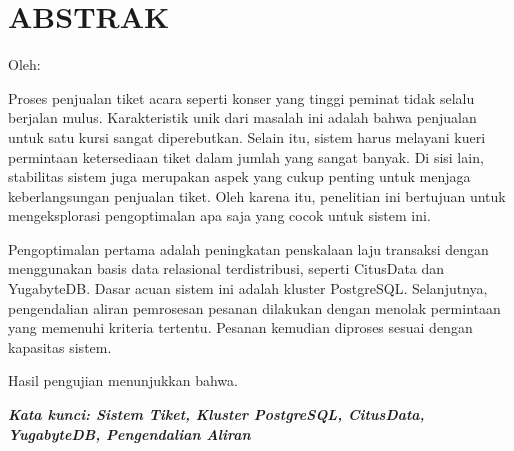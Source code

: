 \clearpage
\chapter*{ABSTRAK}
\begin{center}
  \center
  \begin{singlespace}
    \large\bfseries\MakeUppercase{\thetitle}

    \normalfont\normalsize
    Oleh:

    \bfseries \theauthor
  \end{singlespace}
\end{center}

\begin{singlespace}
  \small
  Proses penjualan tiket acara seperti konser yang tinggi peminat tidak selalu berjalan mulus. Karakteristik unik dari masalah ini adalah bahwa penjualan untuk satu kursi sangat diperebutkan. Selain itu, sistem harus melayani kueri permintaan ketersediaan tiket dalam jumlah yang sangat banyak. Di sisi lain, stabilitas sistem juga merupakan aspek yang cukup penting untuk menjaga keberlangsungan penjualan tiket. Oleh karena itu, penelitian ini bertujuan untuk mengeksplorasi pengoptimalan apa saja yang cocok untuk sistem ini.

  Pengoptimalan pertama adalah peningkatan penskalaan laju transaksi dengan menggunakan basis data relasional terdistribusi, seperti CitusData dan YugabyteDB. Dasar acuan sistem ini adalah kluster PostgreSQL. Selanjutnya, pengendalian aliran pemrosesan pesanan dilakukan dengan menolak permintaan yang memenuhi kriteria tertentu. Pesanan kemudian diproses sesuai dengan kapasitas sistem.

  Hasil pengujian menunjukkan bahwa.

  \textbf{\textit{Kata kunci: Sistem Tiket, Kluster PostgreSQL, CitusData, YugabyteDB, Pengendalian Aliran}}

\end{singlespace}
\clearpage